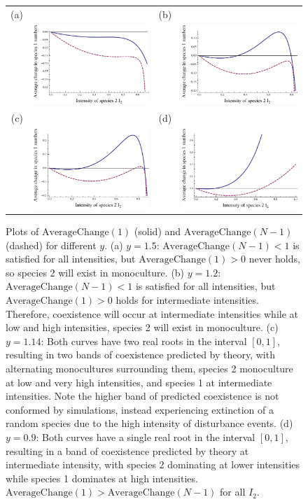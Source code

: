 \begin{figure}[htbp]
\begin{tabular}{rrrr}
(a)&&(b)&\\
&\includegraphics[width=2in]{highy.pdf}&&\includegraphics[width=2in]{lbworkubnot.pdf} \\
(c)&&(d)&\\
&\includegraphics[width=2in]{fourbits.pdf}&&\includegraphics[width=2in]{onerooteach.pdf} \\
\end{tabular}
\caption{Plots of $\text{AverageChange}(1)$ (solid) and $\text{AverageChange}(N-1)$ (dashed) for different $y$. (a) $y=1.5$: $\text{AverageChange}(N-1)<1$ is satisfied for all intensities, but $\text{AverageChange}(1)>0$ never holds, so species 2 will exist in monoculture. (b) $y=1.2$:  $\text{AverageChange}(N-1)<1$ is satisfied for all intensities, but $\text{AverageChange}(1)>0$ holds for intermediate intensities. Therefore, coexistence will occur at intermediate intensities while at low and high intensities, species 2 will exist in monoculture. (c) $y=1.14$: Both curves have two real roots in the interval $[0,1]$, resulting in two bands of coexistence predicted by theory, with alternating monocultures surrounding them, species 2 monoculture at low and very high intensities, and species 1 at intermediate intensities. Note the higher band of predicted coexistence is not conformed by simulations, instead experiencing extinction of a random species due to the high intensity of disturbance events. (d) $y=0.9$: Both curves have a single real root in the interval $[0,1]$, resulting in a band of coexistence predicted by theory at intermediate intensity, with species 2 dominating at lower intensities while species 1 dominates at high intensities. $\text{AverageChange}(1)>\text{AverageChange}(N-1)$ for all $I_2$.}

\end{figure}
